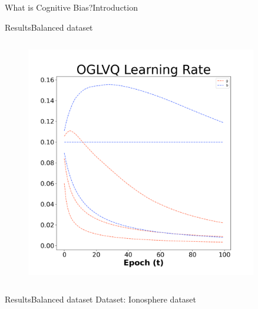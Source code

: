 \documentclass[
	aspectratio=169,	%
	onlytextwidth,		%
	t,					%
	]{beamer}
\begin{document}
\begin{frame}[fragile]{What is Cognitive Bias?}{Introduction}
\begin{frame}[fragile]{Results}{Balanced dataset}
\begin{columns}
			\begin{column}[T]{0.33\textwidth}
				\begin{figure}
					\includegraphics[width=0.9\textwidth]{myfigs/OGLVQ_b.png}
				\end{figure}
			\end{column}
		
			
		\end{columns}
		
		\centering		\color{red}{Be careful with y-axis, since they do not share common size}
	
	\end{frame}
	
	\begin{frame}[fragile]{Results}{Balanced dataset}
		\scriptsize
		Dataset: Ionosphere dataset~\cite{ion} 
		\newline
		\begin{columns}
			

\end{columns}
\end{frame}
\end{frame}
\end{document}
